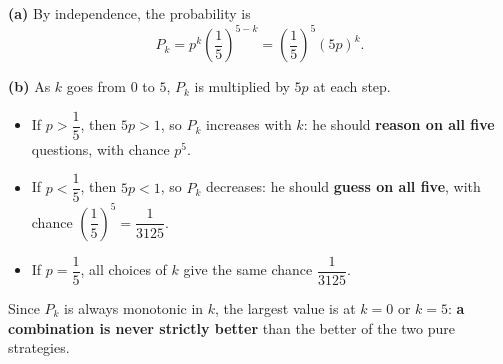 \textbf{(a)} By independence, the probability is
\[P_k=p^k\left(\dfrac{1}{5}\right)^{5-k}=\left(\dfrac{1}{5}\right)^5(5p)^k.\]

\textbf{(b)} As $k$ goes from $0$ to $5$, $P_k$ is multiplied by $5p$ at each step.
\begin{itemize}
\item If $p>\dfrac{1}{5}$, then $5p>1$, so $P_k$ increases with $k$: he should \textbf{reason on all five} questions, with chance $p^5$.
\item If $p<\dfrac{1}{5}$, then $5p<1$, so $P_k$ decreases: he should \textbf{guess on all five}, with chance $\left(\dfrac{1}{5}\right)^5=\dfrac{1}{3125}$.
\item If $p=\dfrac{1}{5}$, all choices of $k$ give the same chance $\dfrac{1}{3125}$.
\end{itemize}
Since $P_k$ is always monotonic in $k$, the largest value is at $k=0$ or $k=5$: \textbf{a combination is never strictly better} than the better of the two pure strategies.
